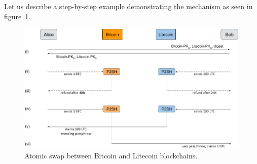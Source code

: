 Let us describe a step-by-step example demonstrating the mechanism as seen in figure~\ref{fig:atomic-swap}.

\begin{figure}[h]
\begin{center}
\includegraphics[scale=0.5]{images/atomic-swap}
\caption{Atomic swap between Bitcoin and Litecoin blockchains.}
\label{fig:atomic-swap}
\end{center}
\end{figure}

